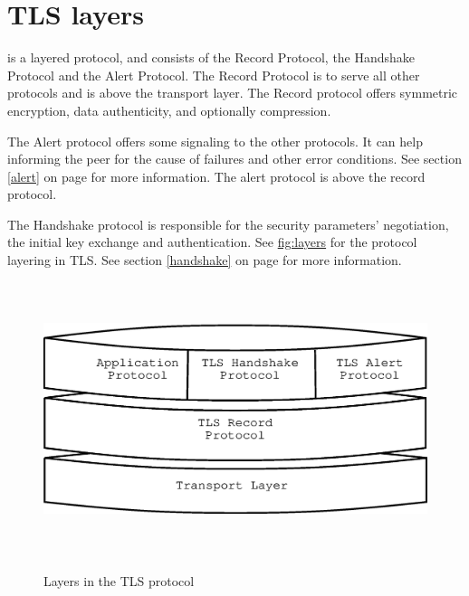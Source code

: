 \section{TLS layers}

\tlsI{} is a layered protocol, and consists of the Record Protocol,
the Handshake Protocol and the Alert Protocol. The Record Protocol
is to serve all other protocols and is above the transport layer.
The Record protocol offers symmetric encryption, data authenticity, and
optionally compression.

\par
The Alert protocol offers some signaling to the other protocols. It can
help informing the peer for the cause of failures and other error
conditions. See section \ref{alert} on page \pageref{alert} for more information.
The alert protocol is above the record protocol.

\par 
The Handshake protocol is responsible for the security parameters'
negotiation, the initial key exchange and
authentication. See \hyperref{figure}{figure }{}{fig:layers} for the
protocol layering in TLS. 
See section \ref{handshake} on page \pageref{handshake} for more information.

\begin{figure}[hbtp]
\includegraphics[height=8cm,width=12cm]{layers}
\label{fig:layers}
\caption{Layers in the TLS protocol}
\end{figure}

\addvspace{1.5cm}

